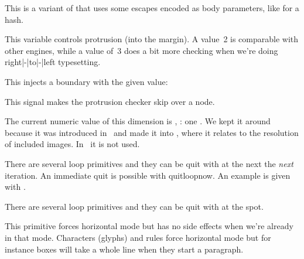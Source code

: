 \stopnewprimitive

\startnewprimitive[title={\prm {protectedexpandeddetokenize}}]

This is a variant of  that uses some escapes encoded as
body parameters, like  for a hash.

\stopnewprimitive

\startnewprimitive[title={\prm {protrudechars}}]

This variable controls protrusion (into the margin). A value~2 is comparable with
other engines, while a value of~3 does a bit more checking when we're doing
right|-|to|-|left typesetting.

\stopnewprimitive

\startnewprimitive[title={\prm {protrusionboundary}}]

This injects a boundary with the given value:


This signal makes the protrusion checker skip over a node.

\stopnewprimitive

\startnewprimitive[title={\prm {pxdimen}}]

The current numeric value of this dimension is \tointeger \pxdimen, \todimension
\pxdimen: one . We kept it around because it was introduced in \PDFTEX\
and made it into \LUATEX, where it relates to the resolution of included images.
In \CONTEXT\ it is not used.

\stopnewprimitive

\startnewprimitive[title={\prm {quitloop}}]

There are several loop primitives and they can be quit with  at
the next the {\em next} iteration. An immediate quit is possible with \prm
{quitloopnow}. An example is given with \prm {localcontrolledloop}.

\stopnewprimitive

\startnewprimitive[title={\prm {quitloopnow}}]

There are several loop primitives and they can be quit with 
at the spot.

\stopnewprimitive

\startnewprimitive[title={\prm {quitvmode}}]

This primitive forces horizontal mode but has no side effects when we're already
in that mode. Characters (glyphs) and rules force horizontal mode but for
instance boxes will take a whole line when they start a paragraph.

